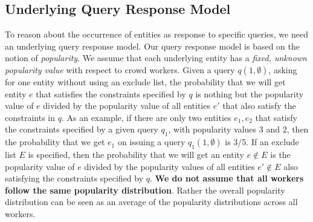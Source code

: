 \subsection{Underlying Query Response Model}
\label{sec:sampling}
To reason about the occurrence of entities as response to specific queries, we need an underlying query response model. Our query response model is based on the notion of {\em popularity}.
\ifpaper We assume that each underlying entity has a {\em fixed, unknown popularity value} with respect to crowd workers. Given a query $q(1, \emptyset)$, asking for one entity without using an exclude list, the probability that we will get entity $e$ that satisfies the constraints specified by $q$ is nothing but the popularity value of $e$ divided by the popularity value of all entities $e'$ that also satisfy the constraints in $q$. As an example, if there are only two entities $e_1, e_2$ that satisfy the constraints specified by a given query $q_1$, with popularity values $3$ and $2$,
then the probability that we get $e_1$ on issuing a query $q_1(1, \emptyset)$ is 3/5. If an exclude list $E$ is specified, then the probability that we will get an entity $e \notin E$ is the popularity value of $e$ divided by the popularity values of all entities $e' \notin E$ also satisfying the constraints specified by $q$. {\bf We do not assume that all workers follow the same popularity distribution}. Rather the overall popularity distribution can be seen as an average of the popularity distributions across all workers.

